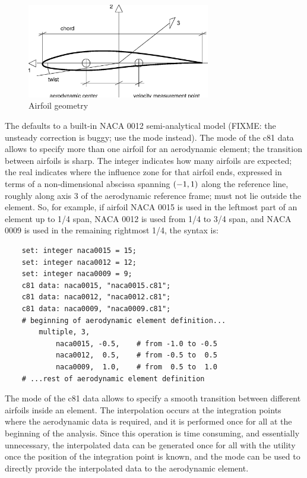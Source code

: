 \begin{figure}[h]
  \centering
    \includegraphics[width=80mm]{airfoil.eps}
  \caption{Airfoil geometry}\label{fig:AIRFOIL}
\end{figure}

The  defaults to a built-in NACA 0012 semi-analytical
model (FIXME: the unsteady correction is buggy; use the  
mode instead).
The  mode of the c81 data allows to specify
more than one airfoil for an aerodynamic element; the transition
between airfoils is sharp.
The integer  indicates how many airfoils are expected;
the real  indicates where the influence zone for that
airfoil ends, expressed in terms of a non-dimensional abscissa spanning 
$\left( -1,1 \right)$ along the reference line, roughly along axis 3 
of the aerodynamic reference frame;  must not lie outside
the element.
So, for example, if airfoil NACA 0015 is used in the leftmost part
of an element up to 1/4 span, NACA 0012 is used from 1/4 to 3/4 span,
and NACA 0009 is used in the remaining rightmost 1/4, the syntax is:
\begin{verbatim}
    set: integer naca0015 = 15;
    set: integer naca0012 = 12;
    set: integer naca0009 = 9;
    c81 data: naca0015, "naca0015.c81";
    c81 data: naca0012, "naca0012.c81";
    c81 data: naca0009, "naca0009.c81";
    # beginning of aerodynamic element definition...
        multiple, 3,
            naca0015, -0.5,    # from -1.0 to -0.5
            naca0012,  0.5,    # from -0.5 to  0.5
            naca0009,  1.0,    # from  0.5 to  1.0
    # ...rest of aerodynamic element definition
\end{verbatim}
The  mode of the c81 data allows to specify 
a smooth transition between different airfoils inside an element.
The interpolation occurs at the integration points where the
aerodynamic data is required, and it is performed once for all
at the beginning of the analysis.
Since this operation is time consuming, and essentially unnecessary,
the interpolated data can be generated once for all with the utility
 once the position of the integration point is known,
and the  mode can be used to directly provide
the interpolated data to the aerodynamic element.

